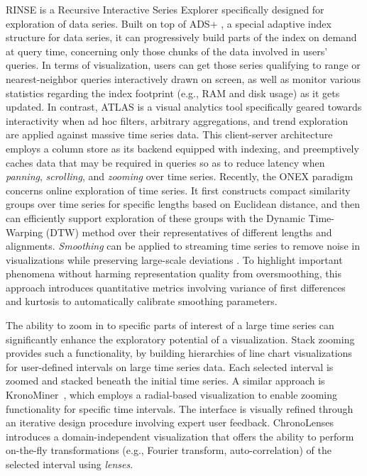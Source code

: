 RINSE \cite{zoumpatianos2015vldb} is a Recursive Interactive Series Explorer specifically designed for exploration of data series. Built on top of ADS+ \cite{zoumpatianos2014sigmod}, a special adaptive index structure for data series, it can progressively build parts of the index on demand at query time, concerning only those chunks of the data involved in users' queries. In terms of visualization, users can get those series qualifying to range or nearest-neighbor queries interactively drawn on screen, as well as monitor various statistics regarding the index footprint (e.g., RAM and disk usage) as it gets updated. In contrast, ATLAS \cite{chan2008vast} is a visual analytics tool specifically geared towards interactivity when ad hoc filters, arbitrary aggregations, and trend exploration are applied against massive time series data. This client-server architecture employs a column store as its backend equipped with indexing, and preemptively caches data that may be required in queries so as to reduce latency when {\em panning}, {\em scrolling}, and {\em zooming} over time series. Recently, the ONEX paradigm \cite{neamtu2016vldb} concerns online exploration of time series. It first constructs compact similarity groups over time series for specific lengths based on Euclidean distance, and then can efficiently support exploration of these groups with the Dynamic Time-Warping (DTW) method over their representatives of different lengths and alignments. {\em Smoothing} can be applied to streaming time series to remove noise in visualizations while preserving large-scale deviations \cite{rong2017vldb}. To highlight important phenomena without harming representation quality from oversmoothing, this approach introduces quantitative metrics involving variance of first differences and kurtosis to automatically calibrate smoothing parameters.

The ability to zoom in to specific parts of interest of a large time series can significantly enhance the exploratory potential of a visualization. Stack zooming~\cite{javed2010stack} provides such a functionality, by building hierarchies of line chart visualizations for user-defined intervals on large time series data. Each selected interval is zoomed and stacked beneath the initial time series. A similar approach is KronoMiner~\cite{zhao2011kronominer}, which employs a radial-based visualization to enable zooming functionality for specific time intervals. The interface is visually refined through an iterative design procedure involving expert user feedback. ChronoLenses \cite{zhao2011exploratory} introduces a domain-independent visualization that offers the ability to perform on-the-fly transformations (e.g., Fourier transform, auto-correlation) of the selected interval using {\em lenses}.

